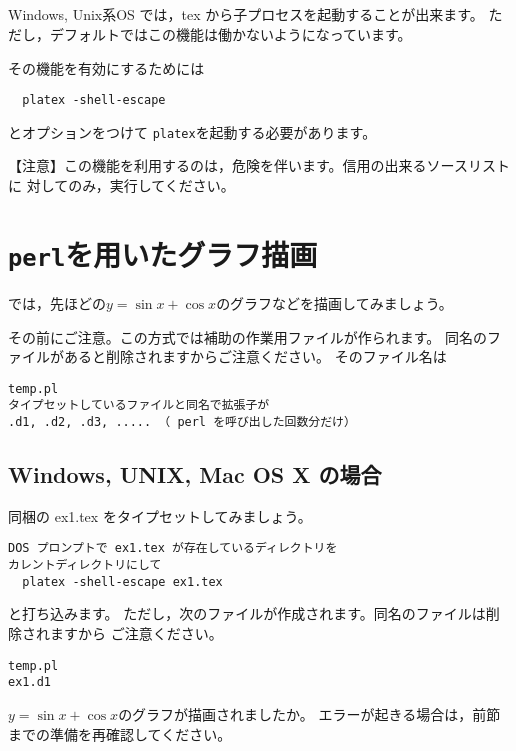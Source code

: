 \documentclass[a4j,fleqn]{jarticle}
\begin{document}
\subsection{}
Windows, Unix系OS では，tex から子プロセスを起動することが出来ます。
ただし，デフォルトではこの機能は働かないようになっています。

その機能を有効にするためには
\begin{jquote}
\begin{verbatim}
  platex -shell-escape
\end{verbatim}
\end{jquote}
とオプションをつけて \texttt{platex}を起動する必要があります。

【注意】この機能を利用するのは，危険を伴います。信用の出来るソースリストに
対してのみ，実行してください。

\section{\texttt{perl}を用いたグラフ描画}
では，先ほどの$y=\sin x+\cos x$のグラフなどを描画してみましょう。

その前にご注意。この方式では補助の作業用ファイルが作られます。
同名のファイルがあると削除されますからご注意ください。
そのファイル名は
\begin{jquote}
\begin{verbatim}
temp.pl
タイプセットしているファイルと同名で拡張子が
.d1, .d2, .d3, ..... （ perl を呼び出した回数分だけ）
\end{verbatim}
\end{jquote}
\subsection{Windows, UNIX, Mac OS X の場合}
同梱の \textsf{ex1.tex} をタイプセットしてみましょう。
\begin{jquote}
\begin{verbatim}
DOS プロンプトで ex1.tex が存在しているディレクトリを
カレントディレクトリにして
  platex -shell-escape ex1.tex
\end{verbatim}
\end{jquote}
と打ち込みます。
ただし，次のファイルが作成されます。同名のファイルは削除されますから
ご注意ください。
\begin{jquote}
\begin{verbatim}
temp.pl
ex1.d1
\end{verbatim}
\end{jquote}
$y=\sin x+\cos x$のグラフが描画されましたか。
エラーが起きる場合は，前節までの準備を再確認してください。
\end{document}
